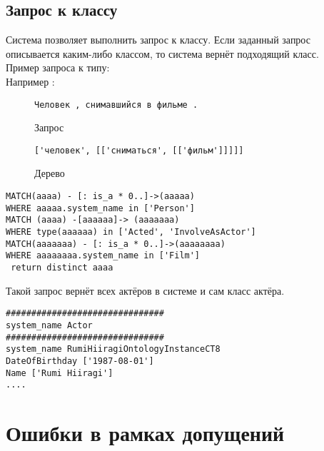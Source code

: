 \subsection{Запрос к классу}
Система позволяет выполнить запрос к классу. Если заданный запрос описывается каким-либо классом, то система вернёт подходящий класс.\\ 
Пример запроса к типу:\\
Например :
\begin{figure}[!h]
\begin{tcolorbox}[colback=white, sharpish corners]
\begin{verbatim}
Человек , снимавшийся в фильме .
\end{verbatim}
\end{tcolorbox}
\caption{Запрос}
\end{figure}
\begin{figure}[!h]
\begin{tcolorbox}[colback=white, sharpish corners]
\begin{verbatim}
['человек', [['сниматься', [['фильм']]]]]
\end{verbatim}
\end{tcolorbox}
\caption{Дерево}
\end{figure}
\newpage
\begin{lstlisting}[caption={Результат}]
MATCH(aaaa) - [: is_a * 0..]->(aaaaa)
WHERE aaaaa.system_name in ['Person']
MATCH (aaaa) -[aaaaaa]-> (aaaaaaa) 
WHERE type(aaaaaa) in ['Acted', 'InvolveAsActor']
MATCH(aaaaaaa) - [: is_a * 0..]->(aaaaaaaa)
WHERE aaaaaaaa.system_name in ['Film']
 return distinct aaaa
\end{lstlisting}
Такой запрос вернёт всех актёров в системе и сам класс актёра. 
\begin{lstlisting}[caption={Результат выполнения запроса}]
###############################
system_name Actor
###############################
system_name RumiHiiragiOntologyInstanceCT8
DateOfBirthday ['1987-08-01']
Name ['Rumi Hiiragi']
....
\end{lstlisting}

\section{Ошибки в рамках допущений}

